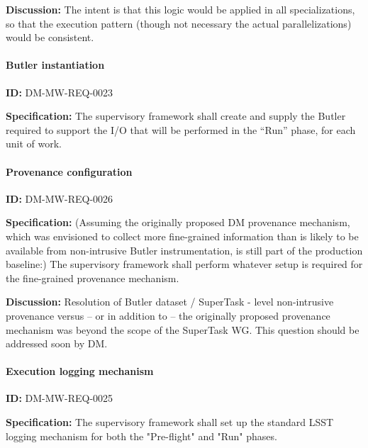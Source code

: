 \documentclass[SE,toc,lsstdraft]{lsstdoc}
\begin{document}
\textbf{Discussion:}
The intent is that this logic would be applied in all specializations, so that the execution pattern (though not necessary the actual parallelizations) would be consistent.




\paragraph{Butler instantiation}\hfill  %

\label{DM-MW-REQ-0023}
\textbf{ID:} DM-MW-REQ-0023

\textbf{Specification:}
The supervisory framework shall create and supply the Butler required to support the I/O that will be performed in the “Run” phase, for each unit of work.





\paragraph{Provenance configuration}\hfill  %

\label{DM-MW-REQ-0026}
\textbf{ID:} DM-MW-REQ-0026

\textbf{Specification:}
(Assuming the originally proposed DM provenance mechanism, which was envisioned to collect more fine-grained information than is likely to be available from non-intrusive Butler instrumentation, is still part of the production baseline:) The supervisory framework shall perform whatever setup is required for the fine-grained provenance mechanism.

\textbf{Discussion:}
Resolution of Butler dataset / SuperTask - level non-intrusive provenance versus – or in addition to – the originally proposed provenance mechanism was beyond the scope of the SuperTask WG. This question should be addressed soon by DM.




\paragraph{Execution logging mechanism}\hfill  %

\label{DM-MW-REQ-0025}
\textbf{ID:} DM-MW-REQ-0025

\textbf{Specification:}
The supervisory framework shall set up the standard LSST logging mechanism for both the "Pre-flight" and "Run" phases.
\end{document}
